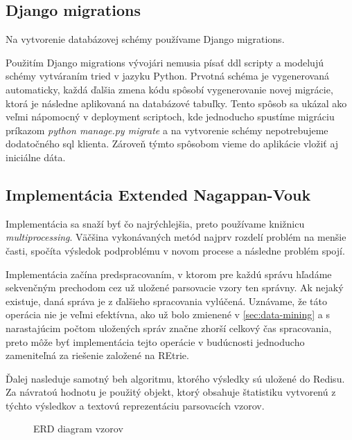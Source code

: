 \subsection{Django migrations}
Na vytvorenie databázovej schémy používame Django migrations. 
\par Použitím Django migrations vývojári nemusia písať ddl scripty a modelujú schémy vytváraním tried v jazyku Python. Prvotná schéma je vygenerovaná automaticky, každá ďalšia zmena kódu spôsobí vygenerovanie novej migrácie, ktorá je následne aplikovaná na databázové tabuľky. Tento spôsob sa ukázal ako veľmi nápomocný v deployment scriptoch, kde jednoducho spustíme migráciu príkazom \emph{python manage.py migrate} a na vytvorenie schémy nepotrebujeme dodatočného sql klienta. Zároveň týmto spôsobom vieme do aplikácie vložiť aj iniciálne dáta.

\subsection{Implementácia Extended Nagappan-Vouk}
Implementácia sa snaží byť čo najrýchlejšia, preto používame knižnicu \emph{multiprocessing}. Väčšina vykonávaných metód najprv rozdelí problém na menšie časti, spočíta výsledok podproblému v novom procese a následne problém spojí. 
\par Implementácia začína predspracovaním, v ktorom pre každú správu hľadáme sekvenčným prechodom cez už uložené parsovacie vzory ten správny. Ak nejaký existuje, daná správa je z ďalšieho spracovania vylúčená. Uznávame, že táto operácia nie je veľmi efektívna, ako už bolo zmienené v \ref{sec:data-mining} a s narastajúcim počtom uložených správ značne zhorší celkový čas spracovania, preto môže byť implementácia tejto operácie v budúcnosti jednoducho zameniteľná za riešenie založené na REtrie. 
\par Ďalej nasleduje samotný beh algoritmu, ktorého výsledky sú uložené do Redisu. Za návratoú hodnotu je použitý objekt, ktorý obsahuje štatistiku vytvorenú z týchto výsledkov a textovú reprezentáciu parsovacích vzorov.

\begin{figure}[htbp]
 \centering 
 \begin{minipage}{0.95\linewidth}
 	\centering
 \end{minipage}
  \caption{ERD diagram vzorov}
  \label{fig:erd-patterns}
\end{figure}

